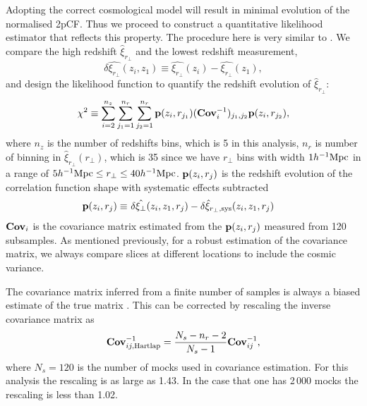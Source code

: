 \documentclass[iop]{emulateapj}
\begin{document}
Adopting the correct cosmological model will result in minimal evolution of the normalised 2pCF.
Thus we proceed to construct a quantitative likelihood estimator that reflects this property.
The procedure here is very similar to \cite{Li2014,Li2015,Li2016}.
We compare the high redshift $\hat\xi_{r_\perp}$ and the lowest redshift measurement,
\begin{equation}
 \delta \hat{\xi_{r_\perp}}(z_i,z_1) \equiv \hat{\xi_{r_\perp}}(z_i) - \hat{\xi_{r_\perp}}(z_1),
\end{equation}
and design the likelihood function to quantify
the redshift evolution of $\hat\xi_{r_\perp}$:
\begin{equation}\label{eq:chisq1}
\chi^2\equiv \sum_{i=2}^{n_{z}} \sum_{j_1=1}^{n_{r}} \sum_{j_2=1}^{n_{r}} {\bf p}(z_i,r_{j_1}) ({\bf Cov}_{i}^{-1})_{j_1,j_2}  {\bf p}(z_i,r_{j_2}),
\end{equation}
where $n_z$ is the number of redshifts bins, which is 5 in this analysis, 
$n_r$ is number of binning in $\hat{\xi}_{r_\perp}(r_\perp)$,
which is 35 since we have $r_\perp$ bins 
with width $1h^{-1}\rm Mpc$ in a range of $5h^{-1}{\rm Mpc}\leq r_\perp\leq 40h^{-1}{\rm Mpc}$.
${\bf p}(z_i,r_{j})$ is the redshift evolution of the correlation function shape with systematic effects subtracted
\begin{eqnarray}\label{eq:bfp}
 {\bf p}(z_i,r_{j}) \equiv&\ \delta \hat{\xi_\perp}(z_i,z_1,r_j) - \delta \hat{\xi}_{r_\perp,\rm sys}(z_i,z_1,r_j)
\end{eqnarray}
${\bf Cov}_i$ is the covariance matrix estimated from the ${\bf p}(z_i,r_{j})$ measured from 120 subsamples.
As mentioned previously, for a robust estimation of the covariance matrix, 
we always compare slices at different locations to 
include the cosmic variance.

The covariance matrix inferred from a finite number of samples
is always a biased estimate of the true matrix \citep{Hartlap}.
This can be corrected by rescaling the inverse covariance matrix as 
\begin{equation}
 {\bf Cov}^{-1}_{ij,\rm Hartlap} = \frac{N_s - n_{r}-2}{N_s-1} {\bf Cov}^{-1}_{ij},
\end{equation}
where $N_s=120$ is the number of mocks used in covariance estimation.
For this analysis the rescaling is as large as 1.43.
In the case that one has 2\,000 mocks the rescaling is less than 1.02.
\end{document}
